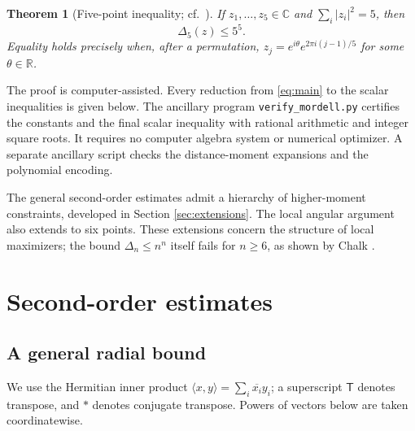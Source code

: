 \documentclass[11pt]{article}
\newtheorem{theorem}{Theorem}[section]
\theoremstyle{remark}
\newcommand{\C}{\mathbb C}
\newcommand{\R}{\mathbb R}
\newcommand{\ip}[2]{\langle#1,#2\rangle}
\numberwithin{equation}{section}
\begin{document}
\begin{theorem}[Five-point inequality; cf.\ \cite{Wang}]
\label{thm:main}
If $z_1,\ldots,z_5\in\C$ and $\sum_i|z_i|^2=5$, then
\begin{equation}\label{eq:main}
 \Delta_5(z)\le5^5.
\end{equation}
Equality holds precisely when, after a permutation,
$z_j=e^{i\theta}e^{2\pi i(j-1)/5}$ for some $\theta\in\R$.
\end{theorem}

The proof is computer-assisted. Every reduction from
\eqref{eq:main} to the scalar inequalities is given below.
The ancillary program \texttt{verify\_mordell.py} certifies the constants
and the final scalar inequality with rational arithmetic and integer
square roots. It requires no computer algebra system or numerical
optimizer. A separate ancillary script checks the distance-moment
expansions and the polynomial encoding.

The general second-order estimates admit a hierarchy of higher-moment
constraints, developed in Section \ref{sec:extensions}. The local
angular argument also extends to six points. These extensions concern
the structure of local maximizers; the bound $\Delta_n\le n^n$ itself
fails for $n\ge6$, as shown by Chalk \cite{Chalk}.

\section{Second-order estimates}
\subsection{A general radial bound}
We use the Hermitian inner product $\ip{x}{y}=\sum_i\overline{x_i}y_i$;
a superscript $\mathsf T$ denotes transpose, and $*$ denotes conjugate
transpose. Powers of vectors below are taken coordinatewise.
\end{document}
